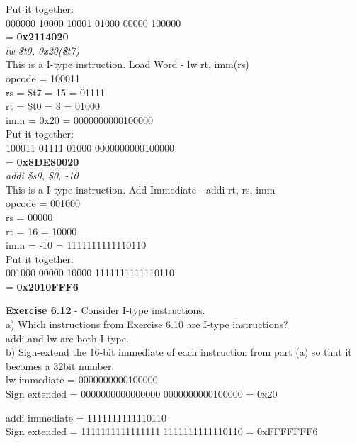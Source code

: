 \documentclass[12pt,a4paper]{report}
\begin{document}
\begin{normalsize}
Put it together: \\
000000 10000 10001 01000 00000 100000 \\
= \textbf{0x2114020} \\

\textit{lw \$t0, 0x20(\$t7)} \\
This is a I-type instruction. Load Word - lw rt, imm(rs) \\

opcode = 100011 \\
rs = \$t7 = 15 = 01111 \\
rt = \$t0 = 8 = 01000 \\
imm = 0x20 = 0000000000100000 \\

Put it together: \\
100011 01111 01000 0000000000100000 \\
= \textbf{0x8DE80020} \\

\textit{addi \$s0, \$0, -10} \\
This is a I-type instruction. Add Immediate - addi rt, rs, imm \\

opcode = 001000 \\
rs = 00000 \\
rt = 16 = 10000 \\
imm = -10 = 1111111111110110 \\

Put it together: \\
001000 00000 10000 1111111111110110 \\
= \textbf{0x2010FFF6} \\

\medskip

\textbf{Exercise 6.12} - Consider I-type instructions. \\
a) Which instructions from Exercise 6.10 are I-type instructions? \\
addi and lw are both I-type. \\

b) Sign-extend the 16-bit immediate of each instruction from part (a) so that it becomes a 32bit number. \\
lw immediate = 0000000000100000 \\
Sign extended = 0000000000000000 0000000000100000 = 0x20

addi immediate = 1111111111110110 \\
Sign extended = 1111111111111111 1111111111110110 = 0xFFFFFFF6




\end{normalsize}
\end{document}
